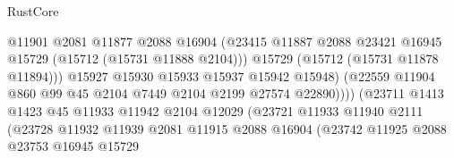 \begin{lexlean}{RustCore}
\begin{coremodule}
                                          @11901
                                          @2081
                                          @11877
                                          @2088
                                          @16904
                                          (@23415
                                            @11887
                                            @2088
                                            @23421
                                            @16945
                                            @15729
                                            (@15712 (@15731 @11888 @2104)))
                                          @15729
                                          (@15712 (@15731 @11878 @11894)))
                                        @15927
                                        @15930
                                        @15933
                                        @15937
                                        @15942
                                        @15948)
                                      (@22559
                                        @11904
                                        @860
                                        @99
                                        @45
                                        @2104
                                        @7449
                                        @2104
                                        @2199
                                        @27574
                                        @22890))))
                                (@23711
                                  @1413
                                  @1423
                                  @45
                                  @11933
                                  @11942
                                  @2104
                                  @12029
                                  (@23721
                                    @11933
                                    @11940
                                    @2111
                                    (@23728
                                      @11932
                                      @11939
                                      @2081
                                      @11915
                                      @2088
                                      @16904
                                      (@23742
                                        @11925
                                        @2088
                                        @23753
                                        @16945
                                        @15729

\end{coremodule}
\end{lexlean}
